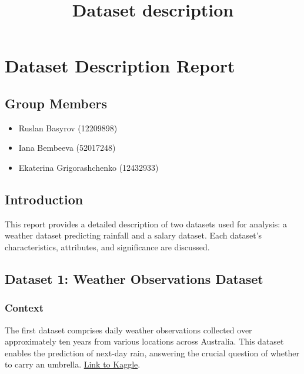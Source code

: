 \documentclass[11pt]{article}
\title{Dataset description}
\providecommand{\tightlist}{%
      \setlength{\itemsep}{0pt}\setlength{\parskip}{0pt}}
\begin{document}
    
    \maketitle
    
    

    
    \section{Dataset Description Report}\label{dataset-description-report}

\subsection{Group Members}\label{group-members}

\begin{itemize}
\tightlist
\item
  Ruslan Basyrov (12209898)
\item
  Iana Bembeeva (52017248)
\item
  Ekaterina Grigorashchenko (12432933)
\end{itemize}

\subsection{Introduction}\label{introduction}

This report provides a detailed description of two datasets used for
analysis: a weather dataset predicting rainfall and a salary dataset.
Each dataset's characteristics, attributes, and significance are
discussed.

    \subsection{Dataset 1: Weather Observations
Dataset}\label{dataset-1-weather-observations-dataset}
\raggedright
\subsubsection{Context}\label{context}

The first dataset comprises daily weather observations collected over
approximately ten years from various locations across Australia. This
dataset enables the prediction of next-day rain, answering the crucial
question of whether to carry an umbrella.
\href{https://www.kaggle.com/datasets/jsphyg/weather-dataset-rattle-package}{Link
to Kaggle}.
\end{document}
